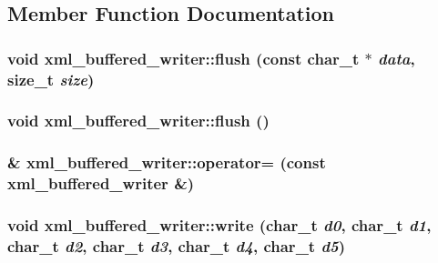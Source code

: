 \subsection{Member Function Documentation}
\hypertarget{classxml__buffered__writer_aa733cb2cd0d5fcacec92c67a7f26c553}{
\subsubsection[{flush}]{\setlength{\rightskip}{0pt plus 5cm}void xml\_\-buffered\_\-writer::flush (const char\_\-t $\ast$ {\em data}, \/  size\_\-t {\em size})}}
\label{classxml__buffered__writer_aa733cb2cd0d5fcacec92c67a7f26c553}
\hypertarget{classxml__buffered__writer_a74192d6bbee5ea387377537ede483b4f}{
\subsubsection[{flush}]{\setlength{\rightskip}{0pt plus 5cm}void xml\_\-buffered\_\-writer::flush ()}}
\label{classxml__buffered__writer_a74192d6bbee5ea387377537ede483b4f}
\hypertarget{classxml__buffered__writer_a0aab8cdf0db6269840a0b16319bdb985}{
\subsubsection[{operator=}]{\& xml\_\-buffered\_\-writer::operator= (const {\bf xml\_\-buffered\_\-writer} \&)}}
\label{classxml__buffered__writer_a0aab8cdf0db6269840a0b16319bdb985}
\hypertarget{classxml__buffered__writer_ae6af5067d768c24b9c20422f76737f29}{
\subsubsection[{write}]{\setlength{\rightskip}{0pt plus 5cm}void xml\_\-buffered\_\-writer::write (char\_\-t {\em d0}, \/  char\_\-t {\em d1}, \/  char\_\-t {\em d2}, \/  char\_\-t {\em d3}, \/  char\_\-t {\em d4}, \/  char\_\-t {\em d5})}}
